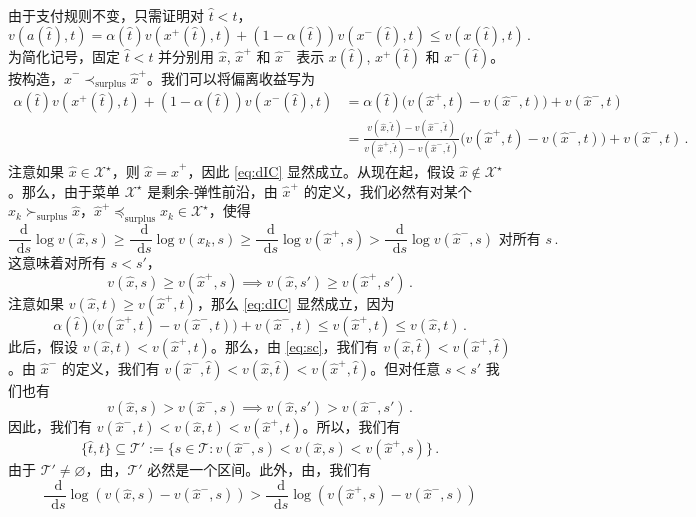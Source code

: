 \documentclass[12pt,letterpaper]{article}
\newenvironment{translation}{\color{blue}\noindent}{}
\theoremstyle{plain}
\theoremstyle{definition}
\theoremstyle{remark}
\let\emptyset\varnothing
\renewcommand{\1}{\mathds{1}}
\renewcommand*\d{\mathop{}\!\mathrm{d}}
\newcommand{\X}{\mathcal{X}}
\theoremstyle{definition}
\begin{document}
\begin{translation}
由于支付规则不变，只需证明对 $\hat{t} < t$，
\[v(a(\hat{t}), t) = \alpha(\hat{t}) v(x^{+}(\hat{t}), t) + (1 - \alpha(\hat{t})) v(x^{-}(\hat{t}), t)  \leq v(x(\hat{t}), t)\,.\label{eq:dIC}\tag{A.1}\]
为简化记号，固定 $\hat{t} < t$ 并分别用 $\hat{x}$, $\hat{x}^+$ 和 $\hat{x}^-$ 表示 $x(\hat{t})$, $x^{+}(\hat{t})$ 和 $x^{-}(\hat{t})$。按构造，$\hat{x}^- \prec_{\text{surplus}} \hat{x}^+$。我们可以将偏离收益写为
\begin{align*}
\alpha(\hat{t}) v(x^{+}(\hat{t}), t) + (1 - \alpha(\hat{t})) v(x^{-}(\hat{t}), t) &= \alpha(\hat{t})\big(v(\hat{x}^+, t) - v(\hat{x}^-, t)\big) +v(\hat{x}^-, t)    \\
 &= \frac{v(\hat{x}, \hat{t}) - v(\hat{x}^{-}, \hat{t})}{ v(\hat{x}^{+}, \hat{t}) -  v(\hat{x}^{-}, \hat{t})}\big(v(\hat{x}^+, t) - v(\hat{x}^-, t)\big) +v(\hat{x}^-, t)\,.
\end{align*}
注意如果 $\hat{x} \in \X^\star$，则 $\hat{x}=\hat{x}^+$，因此 \eqref{eq:dIC} 显然成立。从现在起，假设 $\hat{x} \not\in \X^\star$。那么，由于菜单 $\X^\star$ 是剩余-弹性前沿，由 $\hat{x}^+$ 的定义，我们必然有对某个 $x_k \succ_{\text{surplus}} \hat{x}$，$\hat{x}^+ \preceq_{\text{surplus}} x_k \in \X^\star$，使得
\[\frac{\d}{\d s}\log v(\hat{x}, s) \geq \frac{\d}{\d s}\log v(x_k, s) \geq \frac{\d}{\d s} \log v(\hat{x}^+, s) > \frac{\d}{\d s} \log v(\hat{x}^-, s)\text{ 对所有 $s$}\,. \]
这意味着对所有 $s < s'$，
\[v(\hat{x}, s)\geq v(\hat{x}^+, s) \implies v(\hat{x}, s')\geq v(\hat{x}^+, s')\,. \label{eq:sc} \tag{A.2}\]
注意如果 $v(\hat{x}, t) \geq v(\hat{x}^+, t)$，那么 \eqref{eq:dIC} 显然成立，因为
\[\alpha(\hat{t})\big(v(\hat{x}^+, t) - v(\hat{x}^-, t)\big) +v(\hat{x}^-, t)\leq v(\hat{x}^+, t) \leq v(\hat{x}, t)\,.\]
此后，假设 $v(\hat{x}, t) < v(\hat{x}^+, t)$。那么，由 \eqref{eq:sc}，我们有 $v(\hat{x}, \hat{t}) < v(\hat{x}^+, \hat{t})$。由 $\hat{x}^-$ 的定义，我们有 $v(\hat{x}^-, \hat{t})< v(\hat{x}, \hat{t}) < v(\hat{x}^+, \hat{t})$。但对任意 $s < s'$ 我们也有
\[v(\hat{x}, s) > v(\hat{x}^-, s) \implies v(\hat{x}, s')> v(\hat{x}^-, s')\,. \label{eq:sc2} \tag{A.3}\]
因此，我们有 $v(\hat{x}^-, t) < v(\hat{x}, t) < v(\hat{x}^+, t)$。所以，我们有
\[\{\hat{t}, t\} \subseteq \mathcal{T}':=\big\{s\in \mathcal{T}: v(\hat{x}^-, s) < v(\hat{x}, s) < v(\hat{x}^+, s)\big\}\,.\]
由于 $\mathcal{T}' \neq \emptyset$，由，$\mathcal{T}'$ 必然是一个区间。此外，由，我们有
\[ \frac{\d}{\d s}   \log(v(\hat{x}, s) - v(\hat{x}^-, s))  >  \frac{\d}{\d s}   \log(v(\hat{x}^+, s) - v(\hat{x}^-, s))\]

\end{translation}
\end{document}

